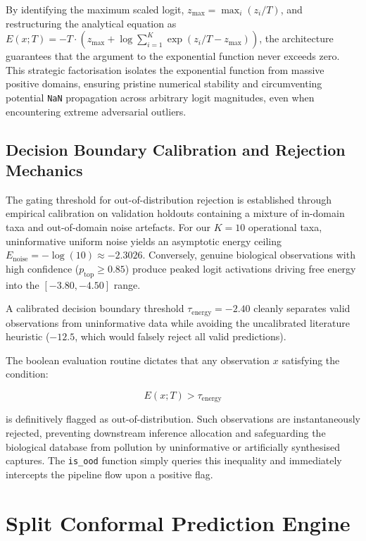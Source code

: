 By identifying the maximum scaled logit, $z_{\text{max}} = \max_i(z_i / T)$, and restructuring the analytical equation as $E(x; T) = -T \cdot (z_{\text{max}} + \log \sum_{i=1}^K \exp(z_i / T - z_{\text{max}}))$, the architecture guarantees that the argument to the exponential function never exceeds zero. This strategic factorisation isolates the exponential function from massive positive domains, ensuring pristine numerical stability and circumventing potential \texttt{NaN} propagation across arbitrary logit magnitudes, even when encountering extreme adversarial outliers.

\subsection{Decision Boundary Calibration and Rejection Mechanics}

The gating threshold for out-of-distribution rejection is established through empirical calibration on validation holdouts containing a mixture of in-domain taxa and out-of-domain noise artefacts. For our $K = 10$ operational taxa, uninformative uniform noise yields an asymptotic energy ceiling $E_{\text{noise}} = -\log(10) \approx -2.3026$. Conversely, genuine biological observations with high confidence ($p_{\text{top}} \ge 0.85$) produce peaked logit activations driving free energy into the $[-3.80, -4.50]$ range.

A calibrated decision boundary threshold $\tau_{\text{energy}} = -2.40$ cleanly separates valid observations from uninformative data while avoiding the uncalibrated literature heuristic ($-12.5$, which would falsely reject all valid predictions).

The boolean evaluation routine dictates that any observation $x$ satisfying the condition:

\begin{equation}
    E(x; T) > \tau_{\text{energy}}
\end{equation}

is definitively flagged as out-of-distribution. Such observations are instantaneously rejected, preventing downstream inference allocation and safeguarding the biological database from pollution by uninformative or artificially synthesised captures. The \texttt{is\_ood} function simply queries this inequality and immediately intercepts the pipeline flow upon a positive flag.

\section{Split Conformal Prediction Engine}
\label{sec:split_conformal_prediction}

